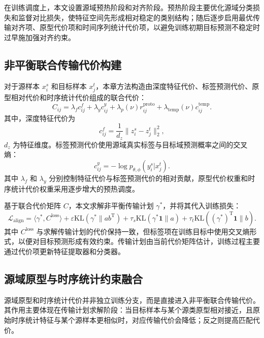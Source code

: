 \documentclass{seuthesis-2022}
\begin{document}
在训练调度上，本文设置源域预热阶段和对齐阶段。预热阶段主要优化源域分类损失和监督对比损失，使特征空间先形成相对稳定的类别结构；随后逐步启用最优传输对齐项、原型代价项和时间序列统计代价项，以避免训练初期目标预测不稳定时过早施加强对齐约束。

\subsection{非平衡联合传输代价构建}

对于源样本 $x_i^s$ 和目标样本 $x_j^t$，本章方法构造由深度特征代价、标签预测代价、原型相对代价和时序统计代价组成的联合代价：
\begin{equation}
    C_{ij}
    =
    \lambda_f c_{ij}^{f}
    +
    \lambda_y c_{ij}^{y}
    +
    \lambda_p(\nu) r_{ij}^{\mathrm{proto}}
    +
    \lambda_{\mathrm{temp}}(\nu)c_{ij}^{\mathrm{temp}}.
\end{equation}
其中，深度特征代价为
\begin{equation}
    c_{ij}^{f}
    =
    \frac{1}{d_z}
    \|z_i^s-z_j^t\|_2^2,
\end{equation}
$d_z$ 为特征维度。标签预测代价使用源域真实标签与目标域预测概率之间的交叉熵：
\begin{equation}
    c_{ij}^{y}
    =
    -\log p_{\theta,\phi}(y_i^s|x_j^t).
\end{equation}
其中 $\lambda_f$ 和 $\lambda_y$ 分别控制特征代价与标签预测代价的相对贡献，原型代价权重和时序统计代价权重采用逐步增大的预热调度。

基于联合代价矩阵 $C$，本文求解非平衡传输计划 $\gamma^\ast$，并将其代入训练损失：
\begin{equation}
    \mathcal{L}_{\mathrm{align}}
    =
    \langle \gamma^\ast,C^{\mathrm{loss}}\rangle
    +
    \varepsilon \mathrm{KL}(\gamma^\ast\|ab^{\mathrm T})
    +
    \tau_s \mathrm{KL}(\gamma^\ast\mathbf{1}\|a)
    +
    \tau_t \mathrm{KL}((\gamma^\ast)^{\mathrm T}\mathbf{1}\|b).
\end{equation}
其中 $C^{\mathrm{loss}}$ 与求解传输计划的代价保持一致，但标签项在训练目标中使用交叉熵形式，以便对目标预测形成有效约束。传输计划由当前代价矩阵估计，训练过程主要通过代价项更新特征提取器和分类器。

\subsection{源域原型与时序统计约束融合}

源域原型和时序统计代价并非独立训练分支，而是直接进入非平衡联合传输代价。其作用主要体现在传输计划求解阶段：当目标样本与某个源类原型相对接近，且原始时序统计特征与某个源样本更相似时，对应传输代价会降低；反之则提高匹配代价。
\end{document}
